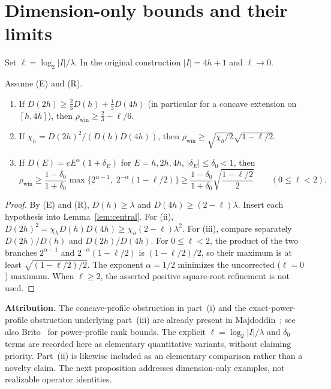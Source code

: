 \documentclass[10pt,a4paper]{article}
\numberwithin{equation}{section}
\theoremstyle{remark}\newtheorem{remark}[theorem]{Remark}\newtheorem{question}[theorem]{Question}
\newcommand{\rhow}{\rho_{\mathrm{win}}}\newcommand{\F}{\mathbb F}\newcommand{\K}{\mathbb K}\newcommand{\Z}{\mathbb Z}\newcommand{\R}{\mathbb R}\newcommand{\cB}{\mathcal L}\newcommand{\wt}{\mathrm{wt}}\newcommand{\dimn}{\operatorname{dim}}\newcommand{\supp}{\operatorname{supp}}
\begin{document}
\section{Dimension-only bounds and their limits}\label{sec:dimensions}
Set $\ell=\log_2|I|/\lambda$. In the original construction $|I|=4h+1$ and $\ell\to0$.
\begin{proposition}\label{prop:profiles}
Assume (E) and (R).
\begin{enumerate}[label=\textup{(\roman*)}]
\item If $D(2h)\ge\tfrac23D(h)+\tfrac13D(4h)$ (in particular for a concave extension on $[h,4h]$), then $\rhow\ge\tfrac23-\ell/6$.
\item If $\chi_h=D(2h)^2/(D(h)D(4h))$, then $\rhow\ge\sqrt{\chi_h/2}\sqrt{1-\ell/2}$.
\item If $D(E)=cE^\alpha(1+\delta_E)$ for $E=h,2h,4h$, $|\delta_E|\le\delta_0<1$, then
\[
\rhow\ge\frac{1-\delta_0}{1+\delta_0}\max\{2^{\alpha-1},\;2^{-\alpha}(1-\ell/2)\}
\ge\frac{1-\delta_0}{1+\delta_0}\sqrt{\frac{1-\ell/2}{2}}\qquad(0\le\ell<2).
\]
\end{enumerate}
\end{proposition}
\begin{proof}By (E) and (R), $D(h)\ge\lambda$ and $D(4h)\ge(2-\ell)\lambda$. Insert each hypothesis into Lemma~\ref{lem:central}. For (ii), $D(2h)^2=\chi_hD(h)D(4h)\ge\chi_h(2-\ell)\lambda^2$. For (iii), compare separately $D(2h)/D(h)$ and $D(2h)/D(4h)$. For $0\le\ell<2$, the product of the two branches $2^{\alpha-1}$ and $2^{-\alpha}(1-\ell/2)$ is $(1-\ell/2)/2$, so their maximum is at least $\sqrt{(1-\ell/2)/2}$. The exponent $\alpha=1/2$ minimizes the uncorrected ($\ell=0$) maximum. When $\ell\ge2$, the asserted positive square-root refinement is not used.\end{proof}
\textbf{Attribution.} The concave-profile obstruction in part~(i) and the exact-power-profile obstruction underlying part~(iii) are already present in Majdoddin~\cite[Section~4.7, Proposition~4.24 and subsequent discussion]{majdoddin}; see also Brito~\cite{brito} for power-profile rank bounds. The explicit $\ell=\log_2|I|/\lambda$ and $\delta_0$ terms are recorded here as elementary quantitative variants, without claiming priority. Part~(ii) is likewise included as an elementary comparison rather than a novelty claim. The next proposition addresses dimension-only examples, not realizable operator identities.
\end{document}
